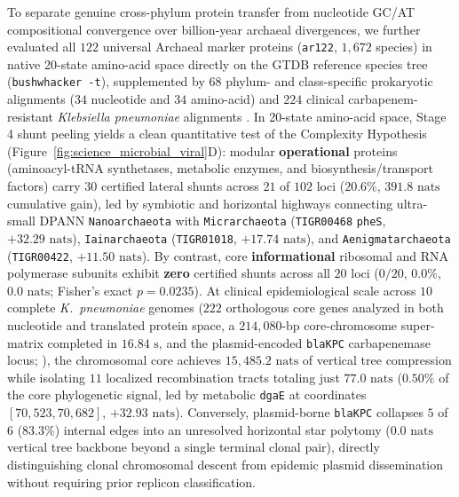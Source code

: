 \documentclass[11pt,a4paper]{article}
\begin{document}
To separate genuine cross-phylum protein transfer from nucleotide GC/AT compositional convergence over billion-year archaeal divergences, we further evaluated all $122$ universal Archaeal marker proteins (\texttt{ar122}, $1,672$ species) in native 20-state amino-acid space directly on the GTDB reference species tree (\texttt{bushwhacker -t}), supplemented by $68$ phylum- and class-specific prokaryotic alignments ($34$ nucleotide and $34$ amino-acid) and $224$ clinical carbapenem-resistant \textit{Klebsiella pneumoniae} alignments \citep{doolittle1999phylogenetic,castelle2018major,wyres2020population}. In 20-state amino-acid space, Stage 4 shunt peeling yields a clean quantitative test of the Complexity Hypothesis \citep{jain1999horizontal,woese2000aminoacyl} (Figure~\ref{fig:science_microbial_viral}D): modular \textbf{operational} proteins (aminoacyl-tRNA synthetases, metabolic enzymes, and biosynthesis/transport factors) carry $30$ certified lateral shunts across $21$ of $102$ loci ($20.6\%$, $391.8\text{ nats}$ cumulative gain), led by symbiotic and horizontal highways connecting ultra-small DPANN \texttt{Nanoarchaeota} \citep{castelle2018major} with \texttt{Micrarchaeota} (\texttt{TIGR00468} \texttt{pheS}, $+32.29\text{ nats}$), \texttt{Iainarchaeota} (\texttt{TIGR01018}, $+17.74\text{ nats}$), and \texttt{Aenigmatarchaeota} (\texttt{TIGR00422}, $+11.50\text{ nats}$). By contrast, core \textbf{informational} ribosomal and RNA polymerase subunits exhibit \textbf{zero} certified shunts across all $20$ loci ($0 / 20$, $0.0\%$, $0.0\text{ nats}$; Fisher's exact $p = 0.0235$). At clinical epidemiological scale across $10$ complete \textit{K.\ pneumoniae} genomes ($222$ orthologous core genes analyzed in both nucleotide and translated protein space, a $214,080\text{-bp}$ core-chromosome super-matrix completed in $16.84\text{ s}$, and the plasmid-encoded \texttt{blaKPC} carbapenemase locus; \citealt{wyres2020population}), the chromosomal core achieves $15,485.2\text{ nats}$ of vertical tree compression while isolating $11$ localized recombination tracts totaling just $77.0\text{ nats}$ ($0.50\%$ of the core phylogenetic signal, led by metabolic \texttt{dgaE} at coordinates $[70{,}523, 70{,}682]$, $+32.93\text{ nats}$). Conversely, plasmid-borne \texttt{blaKPC} collapses $5$ of $6$ ($83.3\%$) internal edges into an unresolved horizontal star polytomy ($0.0\text{ nats}$ vertical tree backbone beyond a single terminal clonal pair), directly distinguishing clonal chromosomal descent from epidemic plasmid dissemination without requiring prior replicon classification.
\end{document}
